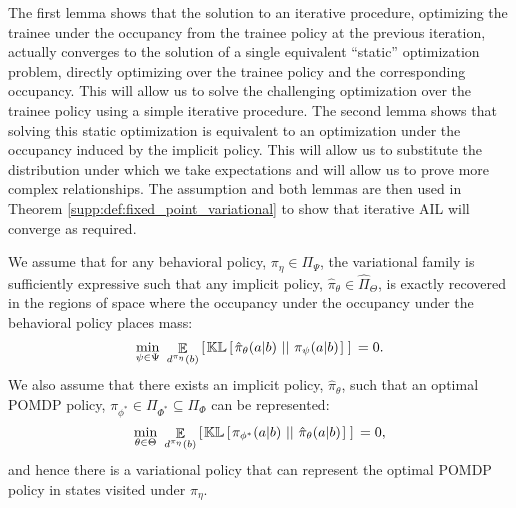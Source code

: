 The first lemma shows that the solution to an iterative procedure, optimizing the trainee under the occupancy from the trainee policy at the previous iteration, actually converges to the solution of a single equivalent ``static'' optimization problem, directly optimizing over the trainee policy and the corresponding occupancy.  This will allow us to solve the challenging optimization over the trainee policy using a simple iterative procedure.  The second lemma shows that solving this static optimization is equivalent to an optimization under the occupancy induced by the implicit policy.  This will allow us to substitute the distribution under which we take expectations and will allow us to prove more complex relationships.  The assumption and both lemmas are then used in Theorem \ref{supp:def:fixed_point_variational} to show that iterative AIL will converge as required.

\begin{assumption}\label{supp:assump:suff_var}
    We assume that for any behavioral policy, $\pi_{\eta} \in \Pi_{\Psi}$, the variational family is sufficiently expressive such that any implicit policy, $\hat{\pi}_{\theta} \in \hat{\Pi}_{\Theta}$, is exactly recovered in the regions of space where the occupancy under the occupancy under the behavioral policy places mass: 
    \begin{equation}
        \mathop{\min}_{\psi \in \Psi} \ \mathop{\mathbb{E}}_{d^{\pi_{\eta}}(b)} \lspsqb{}  \mathbb{KL} \lspsqb{}  {\hat{\pi}_{\theta}}(a|b) \klbars{}  \pi_{\psi}(a|b) \rspsqb{}  \rspsqb{}  = 0. \label{supp:equ:a1:1}
    \end{equation}
    We also assume that there exists an implicit policy, $\hat{\pi}_{\theta}$, such that an optimal POMDP policy, $\pi_{\phi^*} \in \Pi_{\Phi^*} \subseteq \Pi_{\Phi}$ can be represented:
    \begin{equation}
        \mathop{\min}_{\theta \in \Theta} \ \mathop{\mathbb{E}}_{d^{\pi_{\eta}}(b)} \left[ \hspace*{0.1em}{}  \mathbb{KL} \left[ \hspace*{0.1em}{}  \pi_{\phi^*}(a|b) \ ||\ {} {\hat{\pi}_{\theta}}(a|b) \hspace*{0.1em} \right]{}  \hspace*{0.1em} \right]{}  = 0,\label{supp:equ:a1:2}
    \end{equation}
    and hence there is a variational policy that can represent the optimal POMDP policy in states visited under $\pi_{\eta}$.
\end{assumption}

